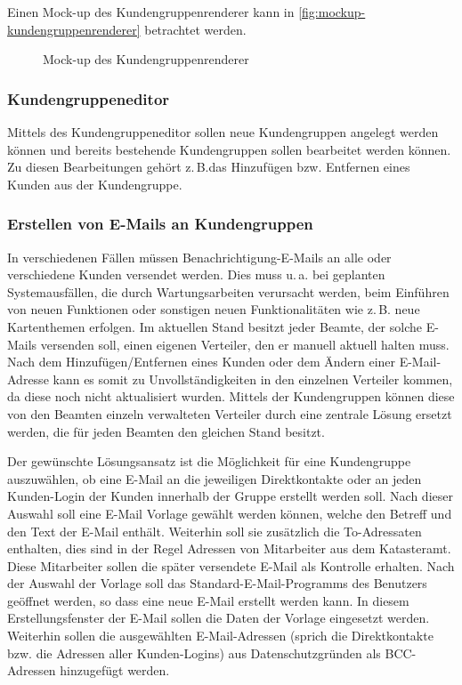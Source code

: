 Einen Mock-up des Kundengruppenrenderer kann in \autoref{fig:mockup-kundengruppenrenderer} betrachtet werden.
\begin{figure}[htb]
	\centering
	\caption{Mock-up des Kundengruppenrenderer}
	\label{fig:mockup-kundengruppenrenderer}
\end{figure}

\subsubsection{Kundengruppeneditor}
Mittels des Kundengruppeneditor sollen neue Kundengruppen angelegt werden können und bereits bestehende Kundengruppen sollen bearbeitet werden können. Zu diesen Bearbeitungen gehört z.\,B.das Hinzufügen bzw. Entfernen eines Kunden aus der Kundengruppe.

\subsubsection{Erstellen von E-Mails an Kundengruppen}
In verschiedenen Fällen müssen Benachrichtigung-E-Mails an alle oder verschiedene Kunden versendet werden.
Dies muss u.\,a. bei geplanten Systemausfällen, die durch Wartungsarbeiten verursacht werden, beim Einführen von neuen Funktionen oder sonstigen neuen Funktionalitäten wie z.\,B. neue Kartenthemen erfolgen.
Im aktuellen Stand besitzt jeder Beamte, der solche E-Mails versenden soll, einen eigenen Verteiler, den er manuell aktuell halten muss.
Nach dem Hinzufügen/Entfernen eines Kunden oder dem Ändern einer E-Mail-Adresse kann es somit zu Unvollständigkeiten in den einzelnen Verteiler kommen, da diese noch nicht aktualisiert wurden.
Mittels der Kundengruppen können diese von den Beamten einzeln verwalteten Verteiler durch eine zentrale Lösung ersetzt werden, die für jeden Beamten den gleichen Stand besitzt.

Der gewünschte Lösungsansatz ist die Möglichkeit für eine Kundengruppe auszuwählen, ob eine E-Mail an die jeweiligen Direktkontakte oder an jeden Kunden-Login der Kunden innerhalb der Gruppe erstellt werden soll.
Nach dieser Auswahl soll eine E-Mail Vorlage gewählt werden können, welche den Betreff und den Text der E-Mail enthält.
Weiterhin soll sie zusätzlich die To-Adressaten enthalten, dies sind in der Regel Adressen von Mitarbeiter aus dem Katasteramt.
Diese Mitarbeiter sollen die später versendete E-Mail als Kontrolle erhalten. 
Nach der Auswahl der Vorlage soll das Standard-E-Mail-Programms des Benutzers geöffnet werden, so dass eine neue E-Mail erstellt werden kann.
In diesem Erstellungsfenster der E-Mail sollen die Daten der Vorlage eingesetzt werden.
Weiterhin sollen die ausgewählten E-Mail-Adressen (sprich die Direktkontakte bzw. die Adressen aller Kunden-Logins) aus Datenschutzgründen als BCC-Adressen hinzugefügt werden.

